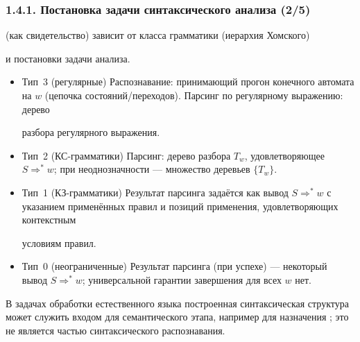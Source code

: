 \begin{frame}
	\frametitle{1.4.1. Постановка задачи синтаксического анализа (2/5)}
	 (как свидетельство) зависит от класса грамматики (иерархия Хомского) 
    
    и постановки задачи анализа.
	
	\begin{itemize}
		\item Тип~3 (регулярные)
		Распознавание: принимающий прогон конечного автомата на $w$ (цепочка состояний/переходов). Парсинг по регулярному выражению: дерево
        
        разбора регулярного выражения.
		
		\item Тип~2 (КС-грамматики)
		Парсинг: дерево разбора $T_w$, удовлетворяющее $S\Rightarrow^* w$; при неоднозначности --- множество деревьев $\{T_w\}$.
		
		\item Тип~1 (КЗ-грамматики)
		Результат парсинга задаётся как вывод $S\Rightarrow^* w$ с указанием применённых правил и позиций применения, удовлетворяющих контекстным 
        
        условиям правил.
		
		\item Тип~0 (неограниченные) Результат парсинга (при успехе) --- некоторый вывод $S\Rightarrow^* w$; универсальной гарантии завершения для всех $w$ нет.
	\end{itemize}
	
	\begin{digress}
		В задачах обработки естественного языка построенная синтаксическая структура может служить входом для семантического этапа, например для назначения ; это не является частью синтаксического распознавания.
	\end{digress}
\end{frame}


